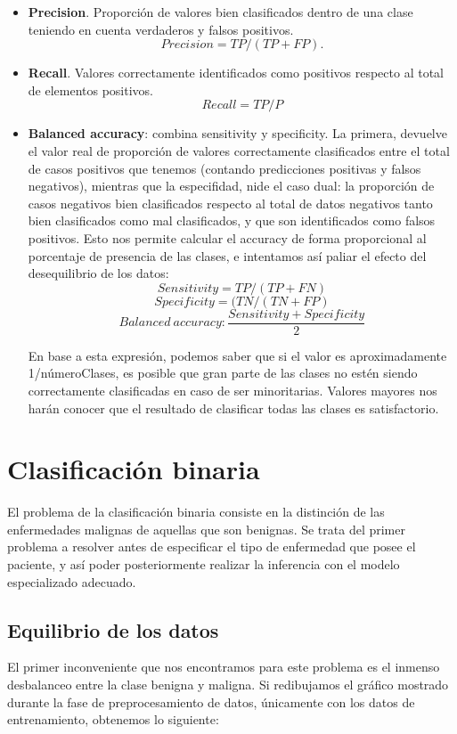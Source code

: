 \begin{itemize}
	\item  \textbf{Precision}. Proporción de valores bien clasificados dentro de una clase teniendo en cuenta verdaderos y falsos positivos. $$Precision=TP / (TP + FP).$$
	\item \textbf{Recall}. Valores correctamente identificados como positivos respecto al total de elementos positivos. $$Recall = TP / P$$
	\item  \textbf{Balanced accuracy}: combina sensitivity y specificity. La primera, devuelve el valor real de proporción de valores correctamente clasificados entre el total de casos positivos que tenemos (contando predicciones positivas y falsos negativos), mientras que la especifidad, nide el caso dual: la proporción de casos negativos bien clasificados respecto al total de datos negativos tanto bien clasificados como mal clasificados, y que son identificados como falsos positivos. Esto nos permite calcular el accuracy de forma proporcional al porcentaje de presencia de las clases, e intentamos así paliar el efecto del desequilibrio de los datos:
	$$Sensitivity = TP/(TP+FN)$$
	$$Specificity =(TN/(TN+FP)$$
$$ Balanced\ accuracy: \frac{Sensitivity + Specificity}{2}$$
	
	En base a esta expresión, podemos saber que si el valor es aproximadamente 1/númeroClases, es posible que gran parte de las clases no estén siendo correctamente clasificadas en caso de ser minoritarias. Valores mayores nos harán conocer que el resultado de clasificar todas las clases es satisfactorio.
\end{itemize}

\section{Clasificación binaria}

El problema de la clasificación binaria consiste en la distinción de las enfermedades malignas de aquellas que son benignas. Se trata del primer problema a resolver antes de especificar el tipo de enfermedad que posee el paciente, y así poder posteriormente realizar la inferencia con el modelo especializado adecuado.

\subsection{Equilibrio de los datos}

El primer inconveniente que nos encontramos para este problema es el inmenso desbalanceo entre la clase benigna y maligna. Si redibujamos el gráfico mostrado durante la fase de preprocesamiento de datos, únicamente con los datos de entrenamiento, obtenemos lo siguiente: 

